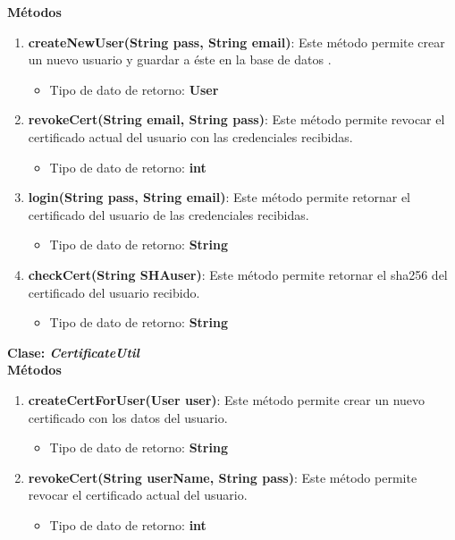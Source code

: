\documentclass[12pt, a4paper, titlepage]{report}
\begin{document}
		            \textbf{Métodos}
    		        \begin{enumerate}
    		            \item \textbf{createNewUser(String pass, String email)}: Este método permite crear un nuevo usuario y guardar a éste en la base de datos .
    		            \begin{itemize}
    		                \item Tipo de dato de retorno: \textbf{User}
    		            \end{itemize}
    		            \item \textbf{revokeCert(String email, String pass)}: Este método permite revocar el certificado actual del usuario con las credenciales recibidas.
    		            \begin{itemize}
    		                \item Tipo de dato de retorno: \textbf{int}
    		            \end{itemize}
    		            \item \textbf{login(String pass, String email)}: Este método permite retornar el certificado del usuario de las credenciales recibidas.
    		            \begin{itemize}
    		                \item Tipo de dato de retorno: \textbf{String}
    		            \end{itemize}
    		            \item \textbf{checkCert(String SHAuser)}: Este método permite retornar el sha256 del certificado del usuario recibido.
    		            \begin{itemize}
    		                \item Tipo de dato de retorno: \textbf{String}
    		            \end{itemize}
    		        \end{enumerate}
    		        
    		    \textbf{\textcolor{guindapoli}{Clase: \textit{CertificateUtil}}}\\
                   
		            \textbf{Métodos}
    		        \begin{enumerate}
    		            \item \textbf{createCertForUser(User user)}: Este método permite crear un nuevo certificado con los datos del usuario.
    		            \begin{itemize}
    		                \item Tipo de dato de retorno: \textbf{String}
    		            \end{itemize}
    		            \item \textbf{revokeCert(String userName, String pass)}: Este método permite revocar el certificado actual del usuario.
    		            \begin{itemize}
    		                \item Tipo de dato de retorno: \textbf{int}
    		            \end{itemize}
    		        \end{enumerate}
    		        
\end{document}
